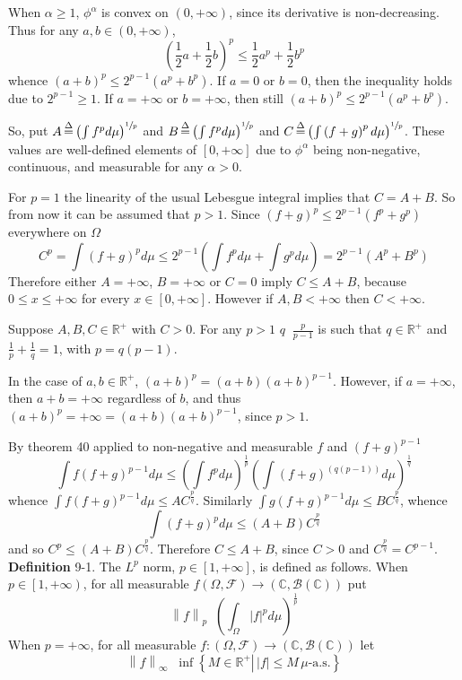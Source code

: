 \documentclass[a4paper]{article}
\newcommand{\obj}[1]{\left\{ #1 \right \}}
\newcommand{\clo}[1]{\left [ #1 \right ]}
\newcommand{\clop}[1]{\left [ #1 \right )}
\newcommand{\brac}[1]{\left ( #1 \right )}
\newcommand{\induc}[1]{\left . #1 \right \vert}
\newcommand{\abs}[1]{\left | #1 \right |}
\newcommand{\nrm}[1]{\left\| #1 \right \|}
\newcommand{\Real}{\mathbb{R}}
\newcommand{\Zinf}{\clo{ 0, +\infty }}
\newcommand{\Cplx}{\mathbb{C}}
\newcommand{\Fcal}{\mathcal{F}}
\newcommand{\borel}[1]{\mathcal{B}\brac{#1}}
\newcommand{\defn}{\mathop{\overset{\Delta}{=}}\nolimits}
\begin{document}
When $\alpha\geq 1$, $\phi^\alpha$ is convex on $\brac{0,+\infty}$, since its derivative is non-decreasing. Thus for any $a,b\in \brac{0, +\infty}$, \[\brac{\frac{1}{2} a + \frac{1}{2}b}^p \leq \frac{1}{2} a^p + \frac{1}{2}b^p\] whence $\brac{a+b}^p\leq 2^{p-1} \brac{a^p+b^p}$. If $a=0$ or $b=0$, then the inequality holds due to $2^{p-1}\geq 1$. If $a=+\infty$ or $b=+\infty$, then still $\brac{a+b}^p\leq 2^{p-1}\brac{a^p+b^p}$.

So, put $A\defn \brac{\int f^p d\mu}^{\sfrac{1}{p}}$ and $B\defn \brac{\int f^p d\mu}^{\sfrac{1}{p}}$ and $C\defn \brac{\int \brac{f+g}^p d\mu}^{\sfrac{1}{p}}$. These values are well-defined elements of $\Zinf$ due to $\phi^\alpha$ being non-negative, continuous, and measurable for any $\alpha>0$.

For $p=1$ the linearity of the usual Lebesgue integral implies that $C=A+B$. So from now it can be assumed that $p>1$. Since $\brac{f+g}^p \leq 2^{p-1} \brac{ f^p + g^p }$ everywhere on $\Omega$ \[C^p = \int \brac{f+g}^p d\mu \leq 2^{p-1}\brac{ \int f^p d\mu + \int g^p d\mu } = 2^{p-1}\brac{ A^p + B^p } \] Therefore either $A=+\infty$, $B=+\infty$ or $C=0$ imply $C\leq A+B$, because $0\leq x\leq +\infty$ for every $x\in \Zinf$. However if $A,B<+\infty$ then $C<+\infty$.

Suppose $A,B,C\in \Real^+$ with $C>0$. For any $p>1$ $q\defn\frac{p}{p-1}$ is such that $q\in \Real^+$ and $\frac{1}{p}+\frac{1}{q}=1$, with $p = q \brac{p-1}$.

In the case of $a,b\in \Real^+$, $\brac{a+b}^p=\brac{a+b}\brac{a+b}^{p-1}$. However, if $a=+\infty$, then $a+b = +\infty$ regardless of $b$, and thus $\brac{a+b}^p=+\infty=\brac{a+b}\brac{a+b}^{p-1}$, since $p>1$.

By theorem 40 applied to non-negative and measurable $f$ and $\brac{f+g}^{p-1}$ \[\int f \brac{f+g}^{p-1} d\mu \leq \brac{\int f^p d\mu}^\frac{1}{p} \brac{ \int \brac{ f+g }^{\brac{q \brac{p-1}}} d\mu }^\frac{1}{q} \] whence $\int f\brac{f+g}^{p-1} d\mu \leq A C^\frac{p}{q}$. Similarly $\int g\brac{f+g}^{p-1} d\mu \leq B C^\frac{p}{q}$, whence \[ \int \brac{f+g}^p d\mu \leq \brac{A+B} C^\frac{p}{q} \] and so $C^p \leq \brac{A+B} C^\frac{p}{q}$. Therefore $C\leq A+B$, since $C>0$ and $C^\frac{p}{q} = C^{p-1}$.\\

\noindent \textbf{Definition} 9-1.
The $L^p$ norm, $p\in\clo{1, +\infty}$, is defined as follows. When $p\in \clop{1, +\infty}$, for all measurable $f\brac{\Omega, \Fcal}\to \brac{\Cplx, \borel{\Cplx}}$ put \[\nrm{f}_p\defn \brac{ \int_\Omega \abs{f}^p d\mu }^\frac{1}{p}\] When $p=+\infty$, for all measurable $f:\brac{\Omega, \Fcal}\to\brac{\Cplx, \borel{\Cplx}}$ let \[\nrm{f}_\infty\defn \inf \obj{ \induc{ M\in \Real^+ }\,\abs{f} \leq M\,\mu\text{-a.s.} } \]
\end{document}
